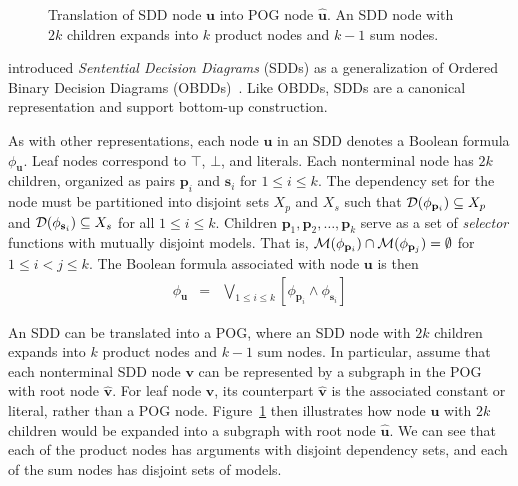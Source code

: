 \documentclass[twoside,11pt]{article}
\newcommand{\tautology}{\top}
\newcommand{\nil}{\bot}
\newcommand{\dependencyset}{{\cal D}}
\newcommand{\modelset}{{\cal M}}
\newcommand{\makenode}[1]{\mathbf{#1}}
\newcommand{\nodeu}{\makenode{u}}
\newcommand{\nodev}{\makenode{v}}
\newcommand{\nodes}{\makenode{s}}
\newcommand{\nodep}{\makenode{p}}
\begin{document}
\begin{figure}
  \begin{center}
    
  \end{center}
\caption{Translation of SDD node $\nodeu$ into POG node $\hat{\nodeu}$.  An SDD node with $2k$ children expands into $k$ product nodes and $k-1$ sum nodes.}
\label{fig:sdd:pog}
\end{figure}

 introduced \emph{Sentential
Decision Diagrams} (SDDs) as a generalization of 
Ordered Binary Decision Diagrams (OBDDs)~\cite{Bryant:1986}.  Like
OBDDs, SDDs are a canonical representation and support bottom-up
construction.

As with other representations, each node $\nodeu$ in an SDD denotes a
Boolean formula $\phi_{\nodeu}$.  Leaf nodes correspond to $\tautology$, $\nil$, and literals.
Each nonterminal node has $2k$ children,
organized as pairs $\nodep_i$ and $\nodes_i$ for $1\leq i \leq k$.
The dependency set for the node must be partitioned into disjoint sets $X_p$ and $X_s$ such that
$\dependencyset(\phi_{\nodep_i}) \subseteq X_p$ and
$\dependencyset(\phi_{\nodes_i}) \subseteq X_s$ for all $1 \leq i \leq k$.
Children $\nodep_1, \nodep_2, \ldots, \nodep_k$ serve as a set of
\emph{selector} functions with mutually disjoint models.  That is,
$\modelset(\phi_{\nodep_i}) \cap \modelset(\phi_{\nodep_j}) =
\emptyset$ for $1 \leq i < j \leq k$.
The Boolean formula associated with node $\nodeu$ is then
\begin{eqnarray}
\phi_{\nodeu} & = & \bigvee_{1 \leq i \leq k} \left[\phi_{\nodep_i} \land \phi_{\nodes_i}\right] \label{eqn:sdd}
\end{eqnarray}

An SDD can be translated into a POG, where an SDD node with $2k$
children expands into $k$ product nodes and $k-1$ sum nodes.
In particular, assume that each nonterminal SDD node $\nodev$ can be represented by a
subgraph in the POG with root node $\hat{\nodev}$.  For leaf node $\nodev$, its counterpart $\hat{\nodev}$ is
the associated constant or literal, rather than a POG node.  Figure~\ref{fig:sdd:pog} then
illustrates how node $\nodeu$ with $2k$ children would be expanded
into a subgraph with root node $\hat{\nodeu}$.  We can see that each
of the product nodes has arguments with disjoint dependency sets, and
each of the sum nodes has disjoint sets of models.
\end{document}
